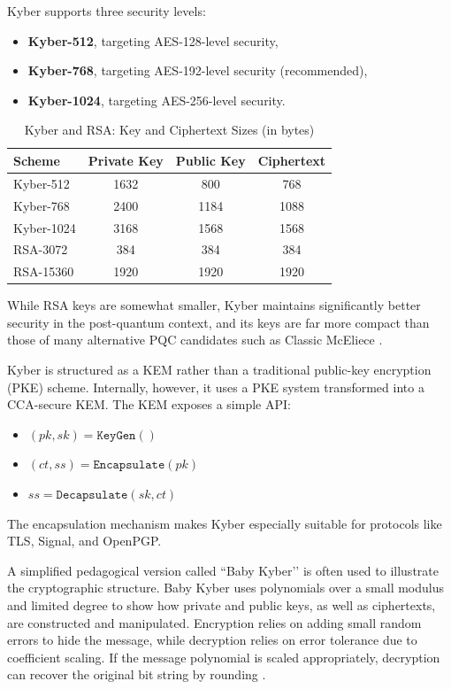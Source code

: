 Kyber supports three security levels:
\begin{itemize}
    \item \textbf{Kyber-512}, targeting AES-128-level security,
    \item \textbf{Kyber-768}, targeting AES-192-level security (recommended),
    \item \textbf{Kyber-1024}, targeting AES-256-level security.
\end{itemize}

\begin{table}[h]
\centering
\caption{Kyber and RSA: Key and Ciphertext Sizes (in bytes)}
\label{tab:kyber_sizes}
\begin{tabular}{|l|c|c|c|}
\hline
\textbf{Scheme} & \textbf{Private Key} & \textbf{Public Key} & \textbf{Ciphertext} \\
\hline
Kyber-512 & 1632 & 800 & 768 \\
Kyber-768 & 2400 & 1184 & 1088 \\
Kyber-1024 & 3168 & 1568 & 1568 \\
RSA-3072 & 384 & 384 & 384 \\
RSA-15360 & 1920 & 1920 & 1920 \\
\hline
\end{tabular}
\end{table}

While RSA keys are somewhat smaller, Kyber maintains significantly better security in the post-quantum context, and its keys are far more compact than those of many alternative PQC candidates such as Classic McEliece \cite{kyber2021}. %

Kyber is structured as a KEM rather than a traditional public-key encryption (PKE) scheme. Internally, however, it uses a PKE system transformed into a CCA-secure KEM. The KEM exposes a simple API:
\begin{itemize}
    \item $(\mathit{pk}, \mathit{sk}) = \texttt{KeyGen}()$
    \item $(\mathit{ct}, \mathit{ss}) = \texttt{Encapsulate}(\mathit{pk})$
    \item $\mathit{ss} = \texttt{Decapsulate}(\mathit{sk}, \mathit{ct})$
\end{itemize}

The encapsulation mechanism makes Kyber especially suitable for protocols like TLS, Signal, and OpenPGP. %

A simplified pedagogical version called ``Baby Kyber’’ is often used to illustrate the cryptographic structure. Baby Kyber uses polynomials over a small modulus and limited degree to show how private and public keys, as well as ciphertexts, are constructed and manipulated. Encryption relies on adding small random errors to hide the message, while decryption relies on error tolerance due to coefficient scaling. If the message polynomial is scaled appropriately, decryption can recover the original bit string by rounding \cite{kyber2021}. %

